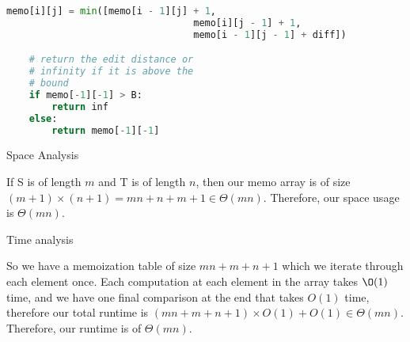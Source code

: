 \documentclass[11pt, letterpaper]{article}
\begin{document}
\begin{enumerate}
\begin{lstlisting}[language=python]
                memo[i][j] = min([memo[i - 1][j] + 1,
                                 memo[i][j - 1] + 1,
                                 memo[i - 1][j - 1] + diff])

    # return the edit distance or
    # infinity if it is above the 
    # bound
    if memo[-1][-1] > B:
        return inf
    else:
        return memo[-1][-1]
\end{lstlisting}

\begin{center}
Space Analysis
\end{center}

\quad If S is of length $m$ and T is of length $n$, then our memo array is of size $(m + 1)\times (n + 1) = mn + n + m + 1 \in \Theta(mn)$. Therefore, our space usage is $\Theta(mn)$. 

\begin{center}
Time analysis
\end{center}

\quad So we have a memoization table of size $mn + m + n + 1$ which we iterate through each element once. Each computation at each element in the array takes $\O(1)$ time, and we have one final comparison at the end that takes $O(1)$ time, therefore our total runtime is $(mn + m + n + 1) \times O(1) + O(1) \in \Theta(mn)$. Therefore, our runtime is of $\Theta(mn)$.

\end{enumerate}
\end{document}
